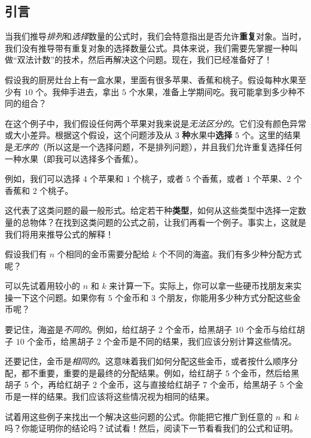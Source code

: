 
\subsection{引言}

当我们推导\emph{排列}和\emph{选择}数量的公式时，我们会特意指出是否允许\textbf{重复}对象。当时，我们没有推导带有重复对象的选择数量公式。具体来说，我们需要先掌握一种叫做``双法计数''的技术，然后再解决这个问题。现在，我们已经准备好了！\\

\begin{example}
    假设我的厨房灶台上有一盒水果，里面有很多苹果、香蕉和桃子。假设每种水果至少有 $10$ 个。我伸手进去，拿出 $5$ 个水果，准备上学期间吃。我可能拿到多少种不同的组合？

    在这个例子中，我们假设任何两个苹果对我来说是\emph{无法区分的}。它们没有颜色异常或大小差异。根据这个假设，这个问题涉及从 $3$ \textbf{种}水果中\textbf{选择} $5$ 个。这里的结果是\emph{无序的}（所以这是一个选择问题，不是排列问题），并且我们允许重复选择任何一种水果（即我可以选择多个香蕉）。

    例如，我们可以选择 $4$ 个苹果和 $1$ 个桃子，或者 $5$ 个香蕉，或者 $1$ 个苹果、$2$ 个香蕉和 $2$ 个桃子。

    这代表了这类问题的最一般形式。给定若干种\textbf{类型}，如何从这些类型中选择一定数量的总物体？在找到这类问题的公式之前，让我们再看一个例子。事实上，这就是我们将用来推导公式的解释！
\end{example}

\begin{example}
    假设我们有 $n$ 个相同的金币需要分配给 $k$ 个不同的海盗。我们有多少种分配方式呢？

    可以先试着用较小的 $n$ 和 $k$ 来计算一下。实际上，你可以拿一些硬币找朋友来实操一下这个问题。如果你有 $5$ 个金币和 $3$ 个朋友，你能用多少种方式分配这些金币呢？
    
    要记住，海盗是\emph{不同的}。例如，给红胡子 $2$ 个金币，给黑胡子 $10$ 个金币与给红胡子 $10$ 个金币，给黑胡子 $2$ 个金币是不同的结果，我们应该分别计算这些情况。
    
    还要记住，金币是\emph{相同的}。这意味着我们如何分配这些金币，或者按什么顺序分配，都不重要，重要的是最终的分配结果。例如，给红胡子 $5$ 个金币，然后给黑胡子 $5$ 个，再给红胡子 $2$ 个金币，这与直接给红胡子 $7$ 个金币，给黑胡子 $5$ 个金币是一样的结果。我们应该将这些情况视为相同的结果。
\end{example}

试着用这些例子来找出一个解决这些问题的公式。你能把它推广到任意的 $n$ 和 $k$ 吗？你能证明你的结论吗？试试看！然后，阅读下一节看看我们的公式和证明。